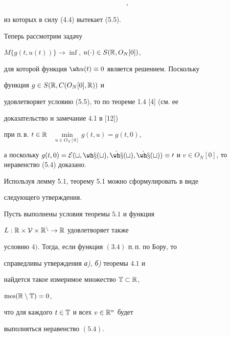 \begin{pf}
\begin{multline*}
[L'_{u}(t,\cdot,\cdot),V\times{\frak U}],


\end{multline*}


из которых в силу (4.4) вытекает (5.5).





Теперь рассмотрим задачу


$M\{g(t,u(t))\}\to\inf$, $u(\cdot)\in S(\Bbb R,O_N[0])$,


для которой функция $\wh u(t)\equiv 0$ является решением. Поскольку


функция $g\in S(\Bbb R,C(O_N[0],\Bbb R))$ и


удовлетворяет условию (5.5), то по теореме 1.4 [4] (см. ее


доказательство и замечание 4.1 в [12])


при п.\,в. $t\in\Bbb R$ \ $\min\limits_{u\in O_N[0]}g(t,u)=g(t,0)$,


а поскольку $g(t,0)=\cal E(t,\wh x(t),\Dot{\wh x}(t),\Dot {\wh x}(t))


\equiv 0$ и $v\in O_N[0]$, то неравенство (5.4) доказано.


\end{pf}





Используя лемму 5.1, теорему 5.1 можно сформулировать в виде


следующего утверждения.





\begin{thms}


Пусть выполнены условия теоремы $5.1$ и функция


${L:\Bbb R\times\cal V\times\Bbb R^n\to\Bbb R}$ удовлетворяет также


условию $4)$. Тогда, если функция $(3.4)$ п.\,п. по Бору, то


справедливы утверждения {\em а), б)} теоремы $4.1$ и


найдется такое измеримое множество $\Bbb T\subset\Bbb R$,


$\operatorname{mes}(\Bbb R\setminus\Bbb T)=0$,


что для каждого $t\in{\Bbb T}$ и всех $v\in\Bbb R^n$ будет


выполняться неравенство $(5.4)$.


\end{thms}





